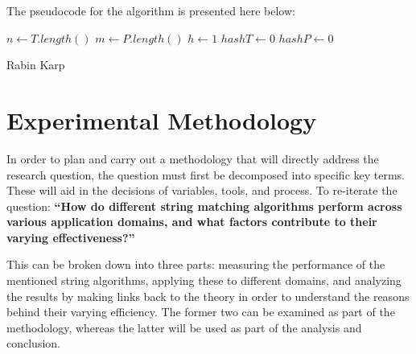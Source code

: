 \documentclass[12pt]{article}
\begin{document}
The pseudocode for the algorithm is presented here below:

\begin{center}
\begin{singlespace}
\begin{minipage}{0.75\linewidth}
\begin{algorithm}[H]
	$n \leftarrow T.length()$ \;
	$m \leftarrow P.length()$ \;
	$h \leftarrow 1$ \;
	$hashT \leftarrow 0$ \;
	$hashP \leftarrow 0$ \;

	\bigskip


	\bigskip


	\bigskip

\caption{Rabin Karp}
\end{algorithm}
\end{minipage}
\end{singlespace}
\end{center}

\section{Experimental Methodology}

In order to plan and carry out a methodology that will directly address the research
question, the question must first be decomposed into specific key terms. These will aid
in the decisions of variables, tools, and process.
To re-iterate the question:
\textbf{“How do different string matching algorithms perform across various application domains, and what factors contribute to their varying effectiveness?”}

This can be broken down into three parts: measuring the performance of the mentioned
string algorithms, applying these to different domains, and analyzing the results by making
links back to the theory in order to understand the reasons behind their varying efficiency.
The former two can be examined as part of the methodology, whereas the latter will be
used as part of the analysis and conclusion.
\end{document}

